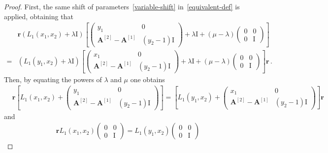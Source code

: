 \documentclass[11pt]{article}
\numberwithin{equation}{section}
\newcommand{\OA}{\mathbf{A}}
\newcommand{\ID}{\mathrm{I}}
\begin{document}
\begin{proof}
First, the same shift of parameters~\eqref{variable-shift} in~\eqref{equivalent-def} is applied, obtaining that \begin{equation}
	\begin{split}
		&\mathbf{r}\left(L_{1}(x_{1},x_{2})+\lambda \ID\right) \left[\left(\begin{array}{cc}
			y_1&0\\
			\OA^{[2]}-\OA^{[1]}&(y_{2}-1)\ID
		\end{array}\right)+\lambda\ID+(\mu-\lambda)\begin{pmatrix}
			0&0\\
			0&\ID
		\end{pmatrix}\right]\\
		=&
		\left(L_{1}(y_{1},x_{2})+\lambda \ID\right) \left[\left(\begin{array}{cc}
			x_1&0\\
			\OA^{[2]}-\OA^{[1]}&(y_{2}-1)\ID
		\end{array}\right)+\lambda\ID+(\mu-\lambda)\begin{pmatrix}
			0&0\\
			0&\ID
		\end{pmatrix}\right]\mathbf{r}\,.
	\end{split}
\end{equation}
Then, by equating the powers of $\lambda$ and $\mu$ one obtains
\begin{equation}\label{eqqq}
	\begin{split}
		&\mathbf{r}\left[L_{1}(x_{1},x_{2})+\left(\begin{array}{cc}
			y_1&0\\
			\OA^{[2]}-\OA^{[1]}&(y_{2}-1)\ID
		\end{array}\right)\right]=\left[L_{1}(y_{1},x_{2})+\left(\begin{array}{cc}
			x_1&0\\
			\OA^{[2]}-\OA^{[1]}&(y_{2}-1)\ID
		\end{array}\right)\right]\mathbf{r}
	\end{split}
\end{equation}
and
\begin{equation}\label{eq:rLI}
	\begin{split}
		\mathbf{r}L_{1}(x_{1},x_{2})\begin{pmatrix}
			0&0\\
			0&\ID
		\end{pmatrix}=L_{1}(y_{1},x_{2})\begin{pmatrix}
			0&0\\
			0&\ID

\end{pmatrix}
\end{split}
\end{equation}
\end{proof}
\end{document}
